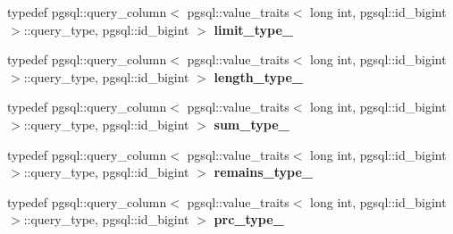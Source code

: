 \begin{DoxyCompactItemize}
\item 
typedef pgsql\+::query\+\_\+column$<$ pgsql\+::value\+\_\+traits$<$ long int, pgsql\+::id\+\_\+bigint $>$\+::query\+\_\+type, pgsql\+::id\+\_\+bigint $>$ {\bfseries limit\+\_\+type\+\_\+}\hypertarget{structodb_1_1query__columns_3_01_1_1kpk_1_1data_1_1_loan_00_01id__pgsql_00_01_a_01_4_acabd28e84990e40ca2b37092427594d8}{}\label{structodb_1_1query__columns_3_01_1_1kpk_1_1data_1_1_loan_00_01id__pgsql_00_01_a_01_4_acabd28e84990e40ca2b37092427594d8}

\item 
typedef pgsql\+::query\+\_\+column$<$ pgsql\+::value\+\_\+traits$<$ long int, pgsql\+::id\+\_\+bigint $>$\+::query\+\_\+type, pgsql\+::id\+\_\+bigint $>$ {\bfseries length\+\_\+type\+\_\+}\hypertarget{structodb_1_1query__columns_3_01_1_1kpk_1_1data_1_1_loan_00_01id__pgsql_00_01_a_01_4_a81711ab7290c2d611d16c3e37defc40b}{}\label{structodb_1_1query__columns_3_01_1_1kpk_1_1data_1_1_loan_00_01id__pgsql_00_01_a_01_4_a81711ab7290c2d611d16c3e37defc40b}

\item 
typedef pgsql\+::query\+\_\+column$<$ pgsql\+::value\+\_\+traits$<$ long int, pgsql\+::id\+\_\+bigint $>$\+::query\+\_\+type, pgsql\+::id\+\_\+bigint $>$ {\bfseries sum\+\_\+type\+\_\+}\hypertarget{structodb_1_1query__columns_3_01_1_1kpk_1_1data_1_1_loan_00_01id__pgsql_00_01_a_01_4_a0b81cf79ea23eb64237f4363d64c2d92}{}\label{structodb_1_1query__columns_3_01_1_1kpk_1_1data_1_1_loan_00_01id__pgsql_00_01_a_01_4_a0b81cf79ea23eb64237f4363d64c2d92}

\item 
typedef pgsql\+::query\+\_\+column$<$ pgsql\+::value\+\_\+traits$<$ long int, pgsql\+::id\+\_\+bigint $>$\+::query\+\_\+type, pgsql\+::id\+\_\+bigint $>$ {\bfseries remains\+\_\+type\+\_\+}\hypertarget{structodb_1_1query__columns_3_01_1_1kpk_1_1data_1_1_loan_00_01id__pgsql_00_01_a_01_4_adb40309f5e524a77ae44a0bc058a7fc7}{}\label{structodb_1_1query__columns_3_01_1_1kpk_1_1data_1_1_loan_00_01id__pgsql_00_01_a_01_4_adb40309f5e524a77ae44a0bc058a7fc7}

\item 
typedef pgsql\+::query\+\_\+column$<$ pgsql\+::value\+\_\+traits$<$ long int, pgsql\+::id\+\_\+bigint $>$\+::query\+\_\+type, pgsql\+::id\+\_\+bigint $>$ {\bfseries prc\+\_\+type\+\_\+}\hypertarget{structodb_1_1query__columns_3_01_1_1kpk_1_1data_1_1_loan_00_01id__pgsql_00_01_a_01_4_a9d558a6f821eeb8b41627b6229335d1d}{}\label{structodb_1_1query__columns_3_01_1_1kpk_1_1data_1_1_loan_00_01id__pgsql_00_01_a_01_4_a9d558a6f821eeb8b41627b6229335d1d}


\end{DoxyCompactItemize}

